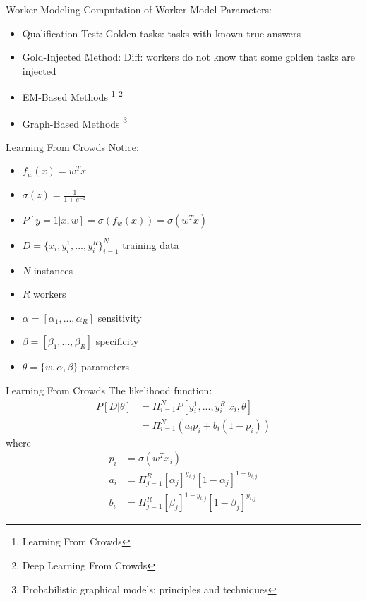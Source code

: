 \documentclass{beamer}
\begin{document}
\begin{frame}{Worker Modeling}
    Computation of Worker Model Parameters:
    \begin{itemize}
        \item Qualification Test: Golden tasks: tasks with known true answers
        \item Gold-Injected Method: Diff: workers do not know that some golden tasks are injected
        \item EM-Based Methods \footnote{Learning From Crowds} \footnote{Deep Learning From Crowds}
        \item Graph-Based Methods \footnote{Probabilistic graphical models: principles and techniques}
    \end{itemize}
\end{frame}

\begin{frame}{Learning From Crowds}
    Notice:
    \begin{itemize}
        \item $f_w(x) = w^T x$
        \item $\sigma(z) = \frac{1}{1 + e^{−z}}$
        \item $P[y = 1 | x, w] = \sigma(f_w(x)) = \sigma(w^Tx)$
        \item $D = \{x_i, y^1_i, ..., y^R_i\}^N_{i=1}$ training data
        \item $N$ instances
        \item $R$ workers
        \item $\alpha = [\alpha_1, ..., \alpha_R]$ sensitivity
        \item $\beta = [\beta_1, ..., \beta_R]$ specificity
        \item $\theta = \{w, \alpha, \beta\}$ parameters
    \end{itemize}
\end{frame}

\begin{frame}{Learning From Crowds}
    The likelihood function:
    \begin{align*}
        P[D|\theta] &= \Pi^N_{i=1} P[y^1_i, ..., y^R_i | x_i, \theta] \\
        &= \Pi^N_{i=1} (a_ip_i + b_i(1-p_i))
    \end{align*}
    where
    \begin{align*}
        p_i &= \sigma(w^Tx_i) \\
        a_i &= \Pi^R_{j=1} [\alpha_j]^{y_{i,j}} [1-\alpha_j]^{1-y_{i,j}} \\
        b_i &= \Pi^R_{j=1} [\beta_j]^{1-y_{i,j}} [1-\beta_j]^{y_{i,j}}
    \end{align*}
\end{frame}
\end{document}
